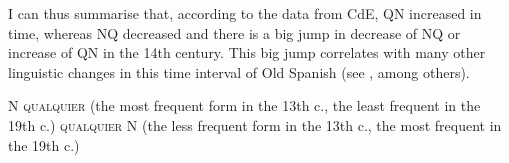 \begin{table}

\caption{QN (=*ualqu* \_N*) and NQ (\_N* *ualqu*) in the whole CdE (Mar. 2020).}
\label{tab:key:22}
\end{table}

I can thus summarise that, according to the data from CdE, QN increased in time, whereas NQ decreased and there is a big jump in decrease of NQ or increase of QN in the 14th century. This big jump correlates with many other linguistic changes in this time interval of Old Spanish (see \citealt{Eberenz2009}, among others).

\ea \label{ex:key:291}
\ea \label{ex:key:291-1}  N \textsc{qualquier} (the most frequent form in the 13th c., the least frequent in the 19th c.)
\ex \label{ex:key:291-2} \textsc{qualquier} N (the less frequent form in the 13th c., the most frequent in the 19th c.)
\z
\z

